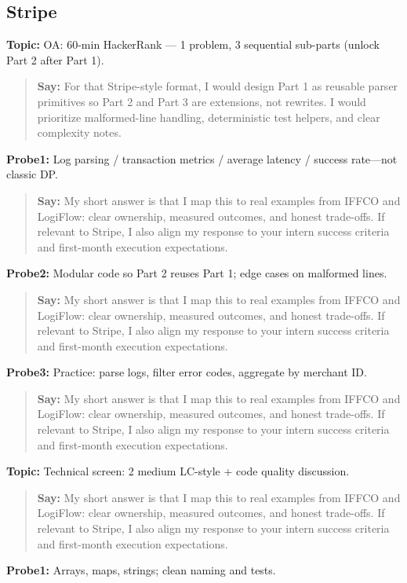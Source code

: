 \documentclass[9pt,a4paper]{article}
\begin{document}
\subsection{Stripe}
\textbf{Topic:} OA: 60-min HackerRank --- 1 problem, 3 sequential sub-parts (unlock Part 2 after Part 1).

\begin{quote}\small\textbf{Say:} For that Stripe-style format, I would design Part 1 as reusable parser primitives so Part 2 and Part 3 are extensions, not rewrites. I would prioritize malformed-line handling, deterministic test helpers, and clear complexity notes.\end{quote}
\vspace{2mm}
\textbf{Probe1:} Log parsing / transaction metrics / average latency / success rate---not classic DP.

\begin{quote}\small\textbf{Say:} My short answer is that I map this to real examples from IFFCO and LogiFlow: clear ownership, measured outcomes, and honest trade-offs. If relevant to Stripe, I also align my response to your intern success criteria and first-month execution expectations.\end{quote}
\vspace{2mm}
\textbf{Probe2:} Modular code so Part 2 reuses Part 1; edge cases on malformed lines.

\begin{quote}\small\textbf{Say:} My short answer is that I map this to real examples from IFFCO and LogiFlow: clear ownership, measured outcomes, and honest trade-offs. If relevant to Stripe, I also align my response to your intern success criteria and first-month execution expectations.\end{quote}
\vspace{2mm}
\textbf{Probe3:} Practice: parse logs, filter error codes, aggregate by merchant ID.

\begin{quote}\small\textbf{Say:} My short answer is that I map this to real examples from IFFCO and LogiFlow: clear ownership, measured outcomes, and honest trade-offs. If relevant to Stripe, I also align my response to your intern success criteria and first-month execution expectations.\end{quote}
\vspace{2mm}
\textbf{Topic:} Technical screen: 2 medium LC-style + code quality discussion.

\begin{quote}\small\textbf{Say:} My short answer is that I map this to real examples from IFFCO and LogiFlow: clear ownership, measured outcomes, and honest trade-offs. If relevant to Stripe, I also align my response to your intern success criteria and first-month execution expectations.\end{quote}
\vspace{2mm}
\textbf{Probe1:} Arrays, maps, strings; clean naming and tests.
\end{document}
